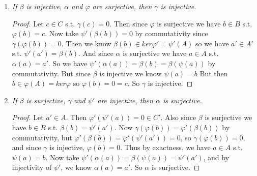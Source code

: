 \documentclass[9pt,reqno,twoside]{amsbook}
\theoremstyle{plain}
\numberwithin{section}{chapter}
\numberwithin{equation}{chapter}
\theoremstyle{definition}
\theoremstyle{remark}
\theoremstyle{plain}
\renewcommand{\phi}{\varphi}
\begin{document}
\begin{enumerate}[label=\arabic*.]
\begin{enumerate}
\begin{proof}
Let $b' \in B$. Then $\phi'(b') \in C'$. So there exists $c \in C$ s.t. $\gamma(c) = \phi'(b')$ since $\gamma$ is surjective and there exists $b \in B$ s.t. $\phi(b) = c$ since $\phi$ is surjective. So we know $\gamma(\phi(b)) = \phi'(\beta(b)) = \phi'(b')$. So $\phi'(\beta(b) - b') = 0$, so $\beta(b) - b' \in ker\phi' = \psi'(A')$. So we know there exists $a' \in A'$ s.t. $\psi'(a') = \beta(b) - b'$. But since $\alpha$ is surjective and $a' \in A'$, we know there exists $a \in A$ s.t. $\psi'(\alpha(a)) = \psi'(a') = \beta(b) - b'$. So we must have that $\beta(\psi(a)) = \beta(b) - b'$ by commutativity. For $b-\psi(a)$ we then have $\beta(b-\psi(a))=\beta(b)-\beta(b)+b'=b'$, which proves that $\beta$ is surjective.
\end{proof}

\item \textit{If $\beta$ is injective, $\alpha$ and $\phi$ are surjective, then $\gamma$ is injective. }

\begin{proof}
Let $c \in C$ s.t. $\gamma(c) = 0$. Then since $\phi$ is surjective we have $b \in B$ s.t. $\phi(b) = c$. Now take $\psi'(\beta(b)) = 0$ by commutativity since $\gamma(\phi(b)) = 0$. Then we know $\beta(b) \in ker\phi' = \psi'(A)$ so we have $a' \in A'$ s.t. $\psi'(a') = \beta(b)$. And since $\alpha$ is surjective we have $a \in A$ s.t. $\alpha(a)  = a'$. So we have $\psi'(\alpha(a)) = \beta(b) = \beta(\psi(a))$ by commutativity. But since $\beta$ is injective we know $\psi(a) = b$ But then $b \in \phi(A) = ker\phi$ so $\phi(b) = 0 = c$. So $\gamma$ is injective. 
\end{proof}

\item \textit{If $\beta$ is surjective, $\gamma$ and $\psi'$ are injective, then $\alpha$ is surjective. }

\begin{proof}
Let $a' \in A$. Then $\phi'(\psi'(a)) = 0 \in C'$. Also since $\beta$ is surjective we have $b \in B$ s.t. $\beta(b) = \psi'(a')$. Now $\gamma(\phi(b)) = \phi'(\beta(b))$ by commutativity, but $\phi'(\beta(b)) = \phi'(\psi'(a')) = 0$, so $\gamma(\phi(b)) = 0$, and since $\gamma$ is injective, $\phi(b) = 0$. Thus by exactness, we have $a \in A$ s.t. $\psi(a) = b$. Now take $\psi'(\alpha(a)) = \beta(\psi(a)) = \psi'(a')$, and by injectivity of $\psi'$, we know $\alpha(a) = a'$. So $\alpha$ is surjective. 
\end{proof}
\end{enumerate}

\end{enumerate}
\end{document}
